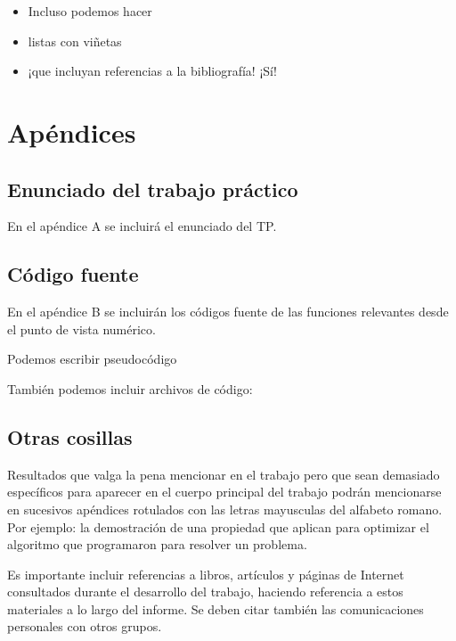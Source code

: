\documentclass[11pt, a4paper, spanish]{article}
\begin{document}
  \begin{itemize}
    \item Incluso podemos hacer
    \item listas con viñetas
    \item ¡que incluyan referencias a la bibliografía! ¡Sí! \cite{nosPodemosCopiarSiLoCitamos}
  \end{itemize}

\section{Apéndices}
\begin{subappendices}

  \subsection{Enunciado del trabajo práctico}

    En el apéndice A se incluirá el enunciado del TP.

  \subsection{Código fuente}

    En el apéndice B se incluirán los códigos fuente de las funciones relevantes desde el punto de vista numérico.

    \begin{algorithm}
      \caption{Podemos escribir pseudocódigo}
    \end{algorithm}

    También podemos incluir archivos de código:
    

  \subsection{Otras cosillas}

    Resultados que valga la pena mencionar en el trabajo pero que sean demasiado específicos para aparecer en el cuerpo principal del trabajo podrán mencionarse en sucesivos apéndices rotulados con las letras mayusculas del alfabeto romano. Por ejemplo: la demostración de una propiedad que aplican para optimizar el algoritmo que programaron para resolver un problema.

\end{subappendices}

\begin{thebibliography}{1}

   Es importante incluir referencias a libros, artículos y páginas de Internet consultados durante el desarrollo del trabajo, haciendo referencia a estos materiales a lo largo del informe.
   Se deben citar también las comunicaciones personales con otros grupos.

\end{thebibliography}
\end{document}
